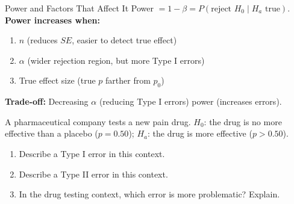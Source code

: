 \documentclass[10pt]{article}
\begin{document}
\begin{notesbox}{Power and Factors That Affect It}
Power $= 1 - \beta = P(\text{reject } H_0 \mid H_a \text{ true})$.\\[4pt]
\textbf{Power increases when:}
\begin{enumerate}[leftmargin=1.5em]
  \item $n$  (reduces $SE$, easier to detect true effect)
  \item $\alpha$  (wider rejection region, but more Type I errors)
  \item True effect size  (true $p$ farther from $p_0$)
\end{enumerate}

\vspace{4pt}
\textbf{Trade-off:} Decreasing $\alpha$ (reducing Type I errors)  power (increases  errors).
\end{notesbox}

\begin{practicebox}
A pharmaceutical company tests a new pain drug. $H_0$: the drug is no more effective than a
placebo ($p = 0.50$); $H_a$: the drug is more effective ($p > 0.50$).

\begin{enumerate}[label=\alph*.]
  \item Describe a Type I error in this context. \\
  \item Describe a Type II error in this context. \\
  \item In the drug testing context, which error is more problematic? Explain. \\
\end{enumerate}
\end{practicebox}
\end{document}
